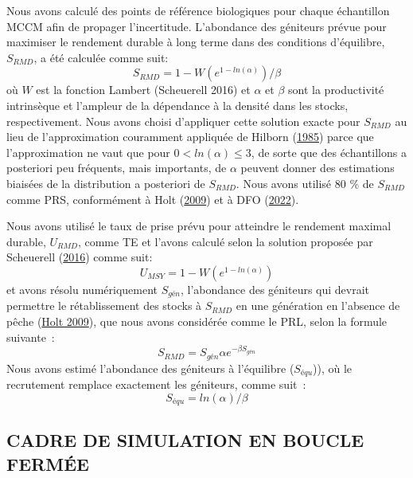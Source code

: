 \documentclass[french,11pt]{book}
\begin{document}
Nous avons calculé des points de référence biologiques pour chaque échantillon MCCM afin de propager l'incertitude. L'abondance des géniteurs prévue pour maximiser le rendement durable à long terme dans des conditions d'équilibre, \(S_{RMD}\), a été calculée comme suit:
\begin{equation}
S_{RMD} = 1 - W(e^{1-ln(\alpha)})/\beta
\label{eq:get-Smsy}
\end{equation}
où \(W\) est la fonction Lambert (Scheuerell 2016) et \(\alpha\) et \(\beta\) sont la productivité intrinsèque et l'ampleur de la dépendance à la densité dans les stocks, respectivement. Nous avons choisi d'appliquer cette solution exacte pour \(S_{RMD}\) au lieu de l'approximation couramment appliquée de Hilborn (\protect\hyperlink{ref-hilborn1985simplified}{1985}) parce que l'approximation ne vaut que pour \(0 <ln(\alpha) \leq3\), de sorte que des échantillons a posteriori peu fréquents, mais importants, de \(\alpha\) peuvent donner des estimations biaisées de la distribution a posteriori de \(S_{RMD}\). Nous avons utilisé 80 \% de \(S_{RMD}\) comme PRS, conformément à Holt (\protect\hyperlink{ref-holtEvaluationBenchmarksConservation2009}{2009}) et à DFO (\protect\hyperlink{ref-dfoSustainableFisheriesFramework2022}{2022}).

Nous avons utilisé le taux de prise prévu pour atteindre le rendement maximal durable, \(U_{RMD}\), comme TE et l'avons calculé selon la solution proposée par Scheuerell (\protect\hyperlink{ref-scheuerellExplicitSolutionCalculating2016}{2016}) comme suit:
\begin{equation}
U_{MSY} = 1 - W(e^{1-ln(\alpha)})
\label{eq:get-Umsy}
\end{equation}
et avons résolu numériquement \(S_{gén}\), l'abondance des géniteurs qui devrait permettre le rétablissement des stocks à \(S_{RMD}\) en une génération en l'absence de pêche (\protect\hyperlink{ref-holtEvaluationBenchmarksConservation2009}{Holt 2009}), que nous avons considérée comme le PRL, selon la formule suivante~:
\begin{equation}
S_{RMD} = S_{gén}\alpha e^{-\beta S_{gén}}
\label{eq:get-Sgen}
\end{equation}
Nous avons estimé l'abondance des géniteurs à l'équilibre (\(S_{équ}\))), où le recrutement remplace exactement les géniteurs, comme suit~:
\begin{equation}
S_{équ} = ln(\alpha)/\beta
\label{eq:get-Seq}
\end{equation}
\hypertarget{cadre-de-simulation-en-boucle-fermuxe9e}{%
\subsection{CADRE DE SIMULATION EN BOUCLE FERMÉE}\label{cadre-de-simulation-en-boucle-fermuxe9e}}
\end{document}
